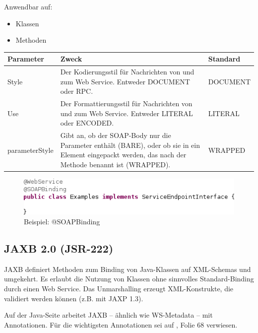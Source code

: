 \documentclass[runningheads]{llncs}
\newcommand{\germanquote}[1]{\glqq{}#1\grqq{}}
\newcommand{\anntabwidth}{\textwidth}
\begin{document}
      \noindent{}Anwendbar auf:
      \begin{itemize}
       \item Klassen
       \item Methoden\vfill
      \end{itemize}
    \tymin=75pt
    \begin{tabulary}{\anntabwidth}{|l|L|L|}
    \hline
    \textbf{Parameter} & \textbf{Zweck} & \textbf{Standard} \\
    \hline
      Style &
      Der Kodierungsstil für Nachrichten von und zum Web Service. Entweder \germanquote{DOCUMENT}
      oder \germanquote{RPC}. &
      DOCUMENT \\
    \hline
      Use &
      Der Formattierungsstil für Nachrichten von und zum Web Service. Entweder
      \germanquote{LITERAL} oder \germanquote{ENCODED}. &
      LITERAL \\
    \hline
      parameterStyle &
      Gibt an, ob der SOAP-Body nur die Parameter enthält (\germanquote{BARE}), oder ob sie in ein
      Element eingepackt werden, das nach der Methode benannt ist (\germanquote{WRAPPED}). &
      WRAPPED \\
    \hline
    \end{tabulary} \vfill
    \tymin=10pt
    \begin{figure}[ht!]
      \centering
      \includegraphics[width=\textwidth]{../images/AtSOAPBinding.png}
      \caption{Beispiel: @SOAPBinding}
      \label{fig:soapb}
    \end{figure} \vfill


  \label{jsr222}
  \subsection{JAXB 2.0 (JSR-222)}
    JAXB\cite{jsr_222} definiert Methoden zum Binding von Java-Klassen auf XML-Schemas und
    umgekehrt. Es erlaubt die Nutzung von Klassen ohne sinnvolles Standard-Binding durch einen Web
    Service. Das Unmarshalling erzeugt XML-Konstrukte, die validiert werden können (z.B. mit JAXP
    1.3).

    Auf der Java-Seite arbeitet JAXB -- ähnlich wie WS-Metadata -- mit Annotationen. Für die
    wichtigsten Annotationen sei auf \cite{ws_crash}, Folie 68 verwiesen.
\end{document}
